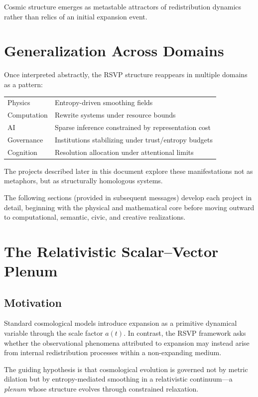 \documentclass[12pt]{article}
\begin{document}
Cosmic structure emerges as metastable attractors of redistribution dynamics rather than relics of an initial expansion event.

\section{Generalization Across Domains}

Once interpreted abstractly, the RSVP structure reappears in multiple domains as a pattern:

\begin{center}
\begin{tabular}{l l}
Physics & Entropy-driven smoothing fields \\
Computation & Rewrite systems under resource bounds \\
AI & Sparse inference constrained by representation cost \\
Governance & Institutions stabilizing under trust/entropy budgets \\
Cognition & Resolution allocation under attentional limits
\end{tabular}
\end{center}

The projects described later in this document explore these manifestations not as metaphors, but as structurally homologous systems.

\bigskip

The following sections (provided in subsequent messages) develop each project in detail, beginning with the physical and mathematical core before moving outward to computational, semantic, civic, and creative realizations.

\section{The Relativistic Scalar--Vector Plenum}

\subsection{Motivation}

Standard cosmological models introduce expansion as a primitive dynamical variable through the scale factor $a(t)$. In contrast, the RSVP framework asks whether the observational phenomena attributed to expansion may instead arise from internal redistribution processes within a non-expanding medium.

The guiding hypothesis is that cosmological evolution is governed not by metric dilation but by entropy-mediated smoothing in a relativistic continuum---a \emph{plenum} whose structure evolves through constrained relaxation.
\end{document}
